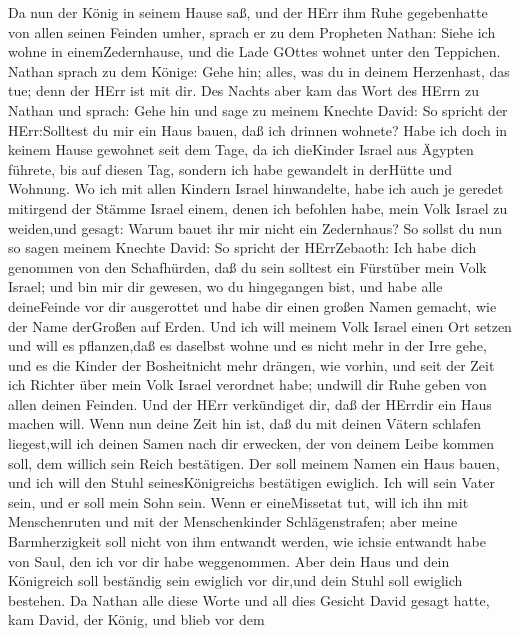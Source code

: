  Da nun der König in seinem Hause saß, und der HErr ihm Ruhe
gegebenhatte von allen seinen Feinden umher,  sprach er zu
dem Propheten Nathan: Siehe ich wohne in einemZedernhause, und die Lade
GOttes wohnet unter den Teppichen.  Nathan sprach zu dem
Könige: Gehe hin; alles, was du in deinem Herzenhast, das tue; denn der
HErr ist mit dir.  Des Nachts aber kam das Wort des HErrn zu
Nathan und sprach:  Gehe hin und sage zu meinem Knechte
David: So spricht der HErr:Solltest du mir ein Haus bauen, daß ich
drinnen wohnete?  Habe ich doch in keinem Hause gewohnet
seit dem Tage, da ich dieKinder Israel aus Ägypten führete, bis auf
diesen Tag, sondern ich habe gewandelt in derHütte und Wohnung.
 Wo ich mit allen Kindern Israel hinwandelte, habe ich auch
je geredet mitirgend der Stämme Israel einem, denen ich befohlen habe,
mein Volk Israel zu weiden,und gesagt: Warum bauet ihr mir nicht ein
Zedernhaus?  So sollst du nun so sagen meinem Knechte David:
So spricht der HErrZebaoth: Ich habe dich genommen von den Schafhürden,
daß du sein solltest ein Fürstüber mein Volk Israel;  und
bin mir dir gewesen, wo du hingegangen bist, und habe alle deineFeinde
vor dir ausgerottet und habe dir einen großen Namen gemacht, wie der
Name derGroßen auf Erden.  Und ich will meinem Volk Israel
einen Ort setzen und will es pflanzen,daß es daselbst wohne und es nicht
mehr in der Irre gehe, und es die Kinder der Bosheitnicht mehr drängen,
wie vorhin,  und seit der Zeit ich Richter über mein Volk
Israel verordnet habe; undwill dir Ruhe geben von allen deinen Feinden.
Und der HErr verkündiget dir, daß der HErrdir ein Haus machen will.
 Wenn nun deine Zeit hin ist, daß du mit deinen Vätern
schlafen liegest,will ich deinen Samen nach dir erwecken, der von deinem
Leibe kommen soll, dem willich sein Reich bestätigen.  Der
soll meinem Namen ein Haus bauen, und ich will den Stuhl
seinesKönigreichs bestätigen ewiglich.  Ich will sein Vater
sein, und er soll mein Sohn sein. Wenn er eineMissetat tut, will ich ihn
mit Menschenruten und mit der Menschenkinder Schlägenstrafen;
 aber meine Barmherzigkeit soll nicht von ihm entwandt
werden, wie ichsie entwandt habe von Saul, den ich vor dir habe
weggenommen.  Aber dein Haus und dein Königreich soll
beständig sein ewiglich vor dir,und dein Stuhl soll ewiglich bestehen.
 Da Nathan alle diese Worte und all dies Gesicht David
gesagt hatte,  kam David, der König, und blieb vor dem
